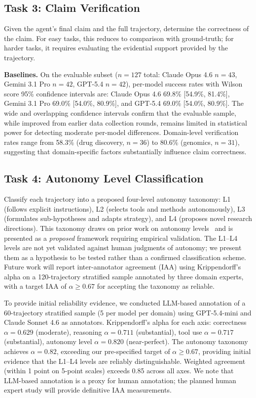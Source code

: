 \documentclass{article}
\begin{document}
\subsection{Task 3: Claim Verification}
\label{sec:task3}

Given the agent's final claim and the full trajectory, determine the correctness of the claim. For easy tasks, this reduces to comparison with ground-truth; for harder tasks, it requires evaluating the evidential support provided by the trajectory.

\textbf{Baselines.} On the evaluable subset ($n=127$ total: Claude Opus 4.6 $n=43$, Gemini 3.1 Pro $n=42$, GPT-5.4 $n=42$), per-model success rates with Wilson score 95\% confidence intervals are: Claude Opus 4.6 69.8\% [54.9\%, 81.4\%], Gemini 3.1 Pro 69.0\% [54.0\%, 80.9\%], and GPT-5.4 69.0\% [54.0\%, 80.9\%]. The wide and overlapping confidence intervals confirm that the evaluable sample, while improved from earlier data collection rounds, remains limited in statistical power for detecting moderate per-model differences. Domain-level verification rates range from 58.3\% (drug discovery, $n=36$) to 80.6\% (genomics, $n=31$), suggesting that domain-specific factors substantially influence claim correctness.

\subsection{Task 4: Autonomy Level Classification}
\label{sec:task4}

Classify each trajectory into a proposed four-level autonomy taxonomy: L1 (follows explicit instructions), L2 (selects tools and methods autonomously), L3 (formulates sub-hypotheses and adapts strategy), and L4 (proposes novel research directions). This taxonomy draws on prior work on autonomy levels~\citep{tom2024selfdriving,hung2024levels} and is presented as a \emph{proposed} framework requiring empirical validation. The L1--L4 levels are not yet validated against human judgments of autonomy; we present them as a hypothesis to be tested rather than a confirmed classification scheme. Future work will report inter-annotator agreement (IAA) using Krippendorff's alpha on a 120-trajectory stratified sample annotated by three domain experts, with a target IAA of $\alpha \geq 0.67$ for accepting the taxonomy as reliable.

To provide initial reliability evidence, we conducted LLM-based annotation of a 60-trajectory stratified sample (5 per model per domain) using GPT-5.4-mini and Claude Sonnet 4.6 as annotators. Krippendorff's alpha for each axis: correctness $\alpha=0.629$ (moderate), reasoning $\alpha=0.711$ (substantial), tool use $\alpha=0.717$ (substantial), autonomy level $\alpha=0.820$ (near-perfect). The autonomy taxonomy achieves $\alpha=0.82$, exceeding our pre-specified target of $\alpha \geq 0.67$, providing initial evidence that the L1--L4 levels are reliably distinguishable. Weighted agreement (within 1 point on 5-point scales) exceeds 0.85 across all axes. We note that LLM-based annotation is a proxy for human annotation; the planned human expert study will provide definitive IAA measurements.
\end{document}
